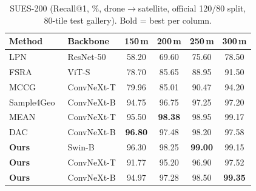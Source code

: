\documentclass[conference]{IEEEtran}
\begin{document}
\begin{table}[t]
\caption{SUES-200 (Recall@1, \%, drone$\to$satellite, official 120/80
split, 80-tile test gallery). Bold = best per column.}
\label{tab:soa_sues200}
\centering
\footnotesize
\setlength{\tabcolsep}{4pt}
\begin{tabular}{l l cccc}
\toprule
Method & Backbone & 150\,m & 200\,m & 250\,m & 300\,m \\
\midrule
LPN~\cite{wang2021lpn}                 & ResNet-50  & 58.20 & 69.60 & 75.60 & 78.50 \\
FSRA~\cite{dai2022fsra}                & ViT-S      & 78.70 & 85.65 & 88.95 & 91.50 \\
MCCG~\cite{shen2024mccg}               & ConvNeXt-T & 79.96 & 85.01 & 90.47 & 94.20 \\
Sample4Geo~\cite{deuser2023sample4geo} & ConvNeXt-B & 94.75 & 96.75 & 97.25 & 97.20 \\
MEAN~\cite{chen2025mean}               & ConvNeXt-T & 95.50 & \textbf{98.38} & 98.95 & 99.17 \\
DAC~\cite{xia2024dac}                  & ConvNeXt-B & \textbf{96.80} & 97.48 & 98.20 & 97.58 \\
\midrule
\textbf{Ours} & Swin-B     & 96.30 & 98.25 & \textbf{99.00} & 99.15 \\
\textbf{Ours} & ConvNeXt-T & 91.77 & 95.20 & 96.90 & 97.52 \\
\textbf{Ours} & ConvNeXt-B & 94.97 & 97.28 & 98.50 & \textbf{99.35} \\
\bottomrule
\end{tabular}
\end{table}
\end{document}
